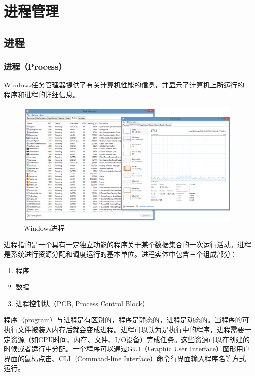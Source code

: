 \chapter{进程管理}

\section{进程}

\subsection{进程（Process）}

Windows任务管理器提供了有关计算机性能的信息，并显示了计算机上所运行的程序和进程的详细信息。

\begin{figure}[H]
	\centering
	\includegraphics[scale=0.6]{img/C2/2-1/1.png}
	\caption{Windows进程}
\end{figure}

进程指的是一个具有一定独立功能的程序关于某个数据集合的一次运行活动。进程是系统进行资源分配和调度运行的基本单位。进程实体中包含三个组成部分：

\begin{enumerate}
	\item 程序
	\item 数据
	\item 进程控制块（PCB, Process Control Block）
\end{enumerate}

程序（program）与进程是有区别的，程序是静态的，进程是动态的。当程序的可执行文件被装入内存后就会变成进程。进程可以认为是执行中的程序，进程需要一定资源（如CPU时间、内存、文件、I/O设备）完成任务。这些资源可以在创建的时候或者运行中分配。一个程序可以通过GUI（Graphic User Interface）图形用户界面的鼠标点击、CLI（Command-line Interface）命令行界面输入程序名等方式运行。

